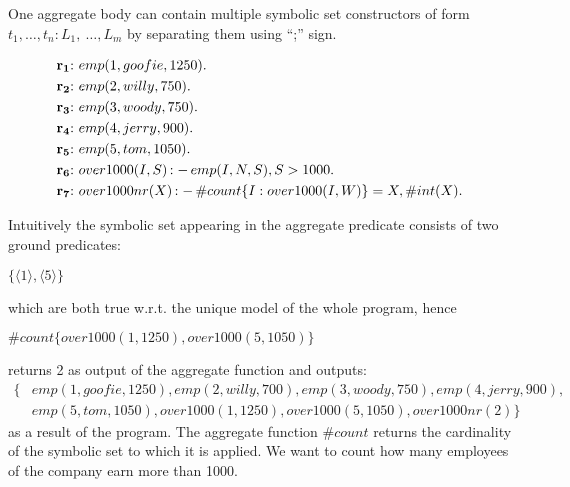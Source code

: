 \documentclass[a4paper, titlepage]{article}
\DeclareMathOperator{\leftimpl}{:-}
\newcommand\mycenterline[1]{\par\smallskip\centerline{#1} \smallskip}
\newcommand{\rowprefix}[1]{%
  \ensuremath{\color{black}\mathbf{#1{:}}\ }%
}
\begin{document}
One aggregate body can contain multiple symbolic set constructors 
of form $t_1, \dots, t_n \colon L_1, \ \dots,L_m$ by separating them using ``;'' sign. 
\begin{exmp}
\begin{align*}
\rowprefix{r_1}& emp(1,goofie,1250).\\
\rowprefix{r_2}& emp(2,willy,750).\\
\rowprefix{r_3}& emp(3,woody,750).\\
\rowprefix{r_4}& emp(4,jerry,900).\\
\rowprefix{r_5}& emp(5,tom,1050). \\
\rowprefix{r_6}& over1000(I,S) \leftimpl emp(I,N,S), S > 1000.\\
\rowprefix{r_7}& over1000nr(X) \leftimpl \#count\{I : 
over1000(I,W)\} = X, \#int(X).
\end{align*}
\end{exmp}
Intuitively the symbolic set appearing in the aggregate 
predicate consists of two ground predicates:
\mycenterline{$\{\langle 1 \rangle,\langle 5 \rangle\}$}
which are both true w.r.t. the unique model of the whole 
program, hence
%
\mycenterline{$ 
\#count\{over1000(1,1250),over1000(5,1050)\}$}
%
returns 2 
as output of the aggregate function and outputs:
\begin{align*}
\{ & \mathit{emp(1,goofie,1250),emp(2,willy,700),emp(3,woody,750),emp(4,jerry,900),}\\
& \mathit{emp(5,tom,1050),over1000(1,1250),over1000(5,1050),over1000nr(2)} \}
\end{align*}
as a result of the program.
The aggregate function $\mathit{\#count}$ returns the 
cardinality of the symbolic set to which it is applied. We 
want to count how many employees of the company earn more 
than 1000. 
\end{document}
